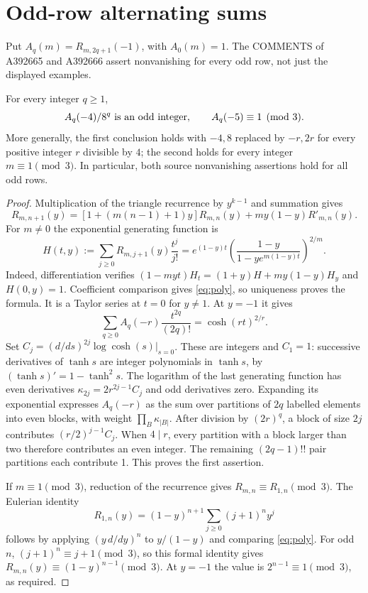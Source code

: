 \section{Odd-row alternating sums}
Put $A_q(m)=R_{m,2q+1}(-1)$, with $A_0(m)=1$.
The COMMENTS of A392665 and A392666 assert nonvanishing for
every odd row, not just the displayed examples.

\begin{corollary}\label{cor:odd}
For every integer $q\geq1$,
\[
 A_q(-4)/8^q\ \hbox{is an odd integer},\qquad
 A_q(-5)\equiv1\pmod3.
\]
More generally, the first conclusion holds with $-4,8$ replaced by
$-r,2r$ for every positive integer $r$ divisible by $4$; the second
holds for every integer $m\equiv1\pmod3$. In particular, both
source nonvanishing assertions hold for all odd rows.
\end{corollary}
\begin{proof}
Multiplication of the triangle recurrence by $y^{k-1}$ and summation gives
\begin{equation}\label{eq:poly}
 R_{m,n+1}(y)=[1+(m(n-1)+1)y]R_{m,n}(y)
              +my(1-y)R'_{m,n}(y).
\end{equation}
For $m\ne0$ the exponential generating function is
\begin{equation}\label{eq:egf}
 H(t,y):=\sum_{j\geq0}R_{m,j+1}(y)\frac{t^j}{j!}
 =e^{(1-y)t}\left(\frac{1-y}{1-ye^{m(1-y)t}}\right)^{2/m}.
\end{equation}
Indeed, differentiation verifies
$(1-myt)H_t=(1+y)H+my(1-y)H_y$ and $H(0,y)=1$.
Coefficient comparison gives \eqref{eq:poly}, so uniqueness proves
the formula. It is a Taylor series at $t=0$ for $y\ne1$.
At $y=-1$ it gives
\[
 \sum_{q\geq0}A_q(-r)\frac{t^{2q}}{(2q)!}
       =\cosh(rt)^{2/r}.
\]
Set $C_j=(d/ds)^{2j}\log\cosh(s)|_{s=0}$.
These are integers and $C_1=1$: successive derivatives of
$\tanh s$ are integer polynomials in $\tanh s$, by
$(\tanh s)'=1-\tanh^2s$.
The logarithm of the last generating function has even derivatives
$\kappa_{2j}=2r^{2j-1}C_j$ and odd derivatives zero.
Expanding its exponential expresses $A_q(-r)$ as the sum over
partitions of $2q$ labelled elements into even blocks, with weight
$\prod_B\kappa_{|B|}$. After division by $(2r)^q$, a block of
size $2j$ contributes $(r/2)^{j-1}C_j$.
When $4\mid r$, every partition with a block larger than two
therefore contributes an even integer. The remaining
$(2q-1)!!$ pair partitions each contribute 1. This proves the
first assertion.

If $m\equiv1\pmod3$, reduction of the recurrence gives
$R_{m,n}\equiv R_{1,n}\pmod3$. The Eulerian identity
\[
 R_{1,n}(y)=(1-y)^{n+1}\sum_{j\geq0}(j+1)^n y^j
\]
follows by applying $(y\,d/dy)^n$ to $y/(1-y)$ and comparing
\eqref{eq:poly}. For odd $n$, $(j+1)^n\equiv j+1\pmod3$,
so this formal identity gives
$R_{m,n}(y)\equiv(1-y)^{n-1}\pmod3$.
At $y=-1$ the value is $2^{n-1}\equiv1\pmod3$, as required.
\end{proof}

